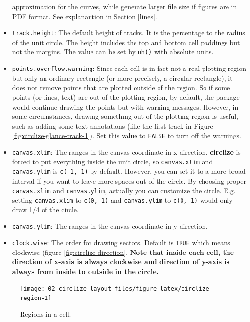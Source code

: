 \documentclass[]{book}
\begin{document}
\begin{itemize}
  approximation for the curves, while generate larger file size if
  figures are in PDF format. See explanantion in Section \ref{lines}.
\item
  \texttt{track.height}: The default height of tracks. It is the
  percentage to the radius of the unit circle. The height includes the
  top and bottom cell paddings but not the margins. The value can be set
  by \texttt{uh()} with absolute units.
\item
  \texttt{points.overflow.warning}: Since each cell is in fact not a
  real plotting region but only an ordinary rectangle (or more
  precisely, a circular rectangle), it does not remove points that are
  plotted outside of the region. So if some points (or lines, text) are
  out of the plotting region, by default, the package would continue
  drawing the points but with warning messages. However, in some
  circumstances, drawing something out of the plotting region is useful,
  such as adding some text annotations (like the first track in Figure
  \ref{fig:circlize-glance-track-1}). Set this value to \texttt{FALSE}
  to turn off the warnings.
\item
  \texttt{canvas.xlim}: The ranges in the canvas coordinate in x
  direction. \textbf{circlize} is forced to put everything inside the
  unit circle, so \texttt{canvas.xlim} and \texttt{canvas.ylim} is
  \texttt{c(-1,\ 1)} by default. However, you can set it to a more broad
  interval if you want to leave more spaces out of the circle. By
  choosing proper \texttt{canvas.xlim} and \texttt{canvas.ylim},
  actually you can customize the circle. E.g. setting
  \texttt{canvas.xlim} to \texttt{c(0,\ 1)} and \texttt{canvas.ylim} to
  \texttt{c(0,\ 1)} would only draw 1/4 of the circle.
\item
  \texttt{canvas.ylim}: The ranges in the canvas coordinate in y
  direction.
\item
  \texttt{clock.wise}: The order for drawing sectors. Default is
  \texttt{TRUE} which means clockwise (figure
  \ref{fig:circlize-direction}. \textbf{Note that inside each cell, the
  direction of x-axis is always clockwise and direction of y-axis is
  always from inside to outside in the circle.}
\end{itemize}

\begin{figure}

{\centering \texttt{[image: 02-circlize-layout\_files/figure-latex/circlize-region-1]} 

}

\caption{Regions in a cell.}\label{fig:circlize-region}
\end{figure}
\end{document}
